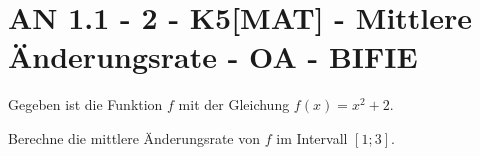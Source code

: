 \section{AN 1.1 - 2 - K5[MAT] - Mittlere Änderungsrate - OA - BIFIE}

\begin{beispiel}[AN 1.1]{1} %
Gegeben ist die Funktion $f$ mit der Gleichung $f(x)=x^2+2$.

Berechne die mittlere Änderungsrate von $f$ im Intervall $[1;3]$.

\end{beispiel}